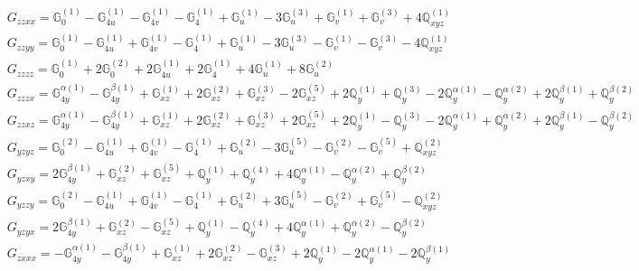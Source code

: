 \documentclass[fleqn,8pt,landscape]{jsarticle}
\begin{document}
\begin{align*}
& G_{zzxx} = \mathbb{G}_{0}^{(1)} - \mathbb{G}_{4u}^{(1)} - \mathbb{G}_{4v}^{(1)} - \mathbb{G}_{4}^{(1)} + \mathbb{G}_{u}^{(1)} - 3 \mathbb{G}_{u}^{(3)} + \mathbb{G}_{v}^{(1)} + \mathbb{G}_{v}^{(3)} + 4 \mathbb{Q}_{xyz}^{(1)} \\
& G_{zzyy} = \mathbb{G}_{0}^{(1)} - \mathbb{G}_{4u}^{(1)} + \mathbb{G}_{4v}^{(1)} - \mathbb{G}_{4}^{(1)} + \mathbb{G}_{u}^{(1)} - 3 \mathbb{G}_{u}^{(3)} - \mathbb{G}_{v}^{(1)} - \mathbb{G}_{v}^{(3)} - 4 \mathbb{Q}_{xyz}^{(1)} \\
& G_{zzzz} = \mathbb{G}_{0}^{(1)} + 2 \mathbb{G}_{0}^{(2)} + 2 \mathbb{G}_{4u}^{(1)} + 2 \mathbb{G}_{4}^{(1)} + 4 \mathbb{G}_{u}^{(1)} + 8 \mathbb{G}_{u}^{(2)} \\
& G_{zzzx} = \mathbb{G}_{4y}^{\alpha(1)} - \mathbb{G}_{4y}^{\beta(1)} + \mathbb{G}_{xz}^{(1)} + 2 \mathbb{G}_{xz}^{(2)} + \mathbb{G}_{xz}^{(3)} - 2 \mathbb{G}_{xz}^{(5)} + 2 \mathbb{Q}_{y}^{(1)} + \mathbb{Q}_{y}^{(3)} - 2 \mathbb{Q}_{y}^{\alpha(1)} - \mathbb{Q}_{y}^{\alpha(2)} + 2 \mathbb{Q}_{y}^{\beta(1)} + \mathbb{Q}_{y}^{\beta(2)} \\
& G_{zzxz} = \mathbb{G}_{4y}^{\alpha(1)} - \mathbb{G}_{4y}^{\beta(1)} + \mathbb{G}_{xz}^{(1)} + 2 \mathbb{G}_{xz}^{(2)} + \mathbb{G}_{xz}^{(3)} + 2 \mathbb{G}_{xz}^{(5)} + 2 \mathbb{Q}_{y}^{(1)} - \mathbb{Q}_{y}^{(3)} - 2 \mathbb{Q}_{y}^{\alpha(1)} + \mathbb{Q}_{y}^{\alpha(2)} + 2 \mathbb{Q}_{y}^{\beta(1)} - \mathbb{Q}_{y}^{\beta(2)} \\
& G_{yzyz} = \mathbb{G}_{0}^{(2)} - \mathbb{G}_{4u}^{(1)} + \mathbb{G}_{4v}^{(1)} - \mathbb{G}_{4}^{(1)} + \mathbb{G}_{u}^{(2)} - 3 \mathbb{G}_{u}^{(5)} - \mathbb{G}_{v}^{(2)} - \mathbb{G}_{v}^{(5)} + \mathbb{Q}_{xyz}^{(2)} \\
& G_{yzxy} = 2 \mathbb{G}_{4y}^{\beta(1)} + \mathbb{G}_{xz}^{(2)} + \mathbb{G}_{xz}^{(5)} + \mathbb{Q}_{y}^{(1)} + \mathbb{Q}_{y}^{(4)} + 4 \mathbb{Q}_{y}^{\alpha(1)} - \mathbb{Q}_{y}^{\alpha(2)} + \mathbb{Q}_{y}^{\beta(2)} \\
& G_{yzzy} = \mathbb{G}_{0}^{(2)} - \mathbb{G}_{4u}^{(1)} + \mathbb{G}_{4v}^{(1)} - \mathbb{G}_{4}^{(1)} + \mathbb{G}_{u}^{(2)} + 3 \mathbb{G}_{u}^{(5)} - \mathbb{G}_{v}^{(2)} + \mathbb{G}_{v}^{(5)} - \mathbb{Q}_{xyz}^{(2)} \\
& G_{yzyx} = 2 \mathbb{G}_{4y}^{\beta(1)} + \mathbb{G}_{xz}^{(2)} - \mathbb{G}_{xz}^{(5)} + \mathbb{Q}_{y}^{(1)} - \mathbb{Q}_{y}^{(4)} + 4 \mathbb{Q}_{y}^{\alpha(1)} + \mathbb{Q}_{y}^{\alpha(2)} - \mathbb{Q}_{y}^{\beta(2)} \\
& G_{zxxx} = - \mathbb{G}_{4y}^{\alpha(1)} - \mathbb{G}_{4y}^{\beta(1)} + \mathbb{G}_{xz}^{(1)} + 2 \mathbb{G}_{xz}^{(2)} - \mathbb{G}_{xz}^{(3)} + 2 \mathbb{Q}_{y}^{(1)} - 2 \mathbb{Q}_{y}^{\alpha(1)} - 2 \mathbb{Q}_{y}^{\beta(1)} \\

\end{align*}
\end{document}
